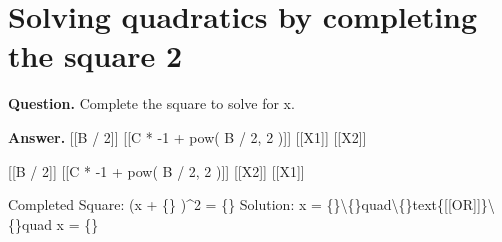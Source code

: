 \documentclass{article}
\begin{document}
\section*{Solving quadratics by completing the square 2}
\textbf{Question.} Complete the square to solve for x.

\textbf{Answer.} [[B / 2]]
                        [[C * -1 + pow( B / 2, 2 )]]
                        [[X1]]
                        [[X2]]
                    
                    
                        [[B / 2]]
                        [[C * -1 + pow( B / 2, 2 )]]
                        [[X2]]
                        [[X1]]
                    
                    
                        
                            Completed Square: 
                            (x + \{\} )\textasciicircum{}2 = \{\}  
                            Solution: 
                            x = \{\}\textbackslash\{\}quad\textbackslash\{\}text\{[[OR]]\}\textbackslash\{\}quad x = \{\}
\end{document}
